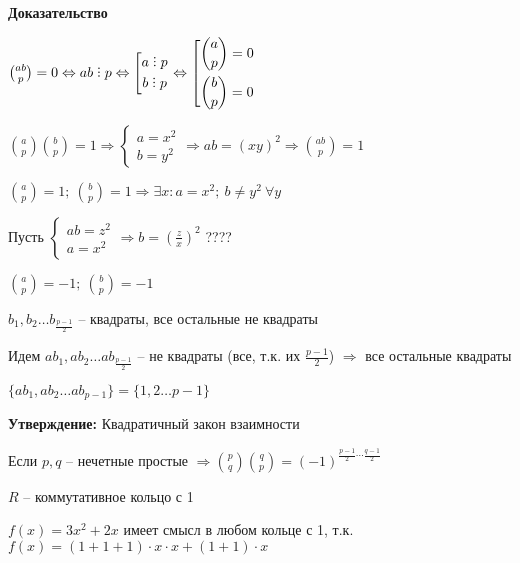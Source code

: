 \documentclass[14pt, letter paper]{article}
\DeclareRobustCommand{\divby}{%
  \mathrel{\text{\vbox{\baselineskip.65ex\lineskiplimit0pt\hbox{.}\hbox{.}\hbox{.}}}}%
}
\begin{document}
\begin{enumerate}
    \begin{center}
        \textbf{Доказательство}
    \end{center}

    ${ab \choose p} = 0 \Leftrightarrow ab \divby p \Leftrightarrow \left[ \begin{gathered}
        a \divby p \\
        b \divby p
    \end{gathered} \right. \Leftrightarrow \left[ \begin{gathered}
        {a \choose p} = 0 \\
        {b \choose p} = 0
    \end{gathered} \right.$

    ${a \choose p}{b \choose p} = 1 \Rightarrow \begin{cases}
        a = x^2 \\
        b = y^2
    \end{cases} \Rightarrow ab = (xy)^2 \Rightarrow {ab \choose p} = 1$

    ${a \choose p} = 1;\ {b \choose p} = 1 \Rightarrow \exists x : a = x^2;\ b \neq y^2\ \forall y$

    Пусть $\begin{cases}
        ab = z^2 \\
        a = x^2
    \end{cases} \Rightarrow b = (\frac{z}{x})^2$ ????

    ${a \choose p} = -1;\ {b \choose p} = -1$

    $b_1, b_2 \ldots b_\frac{p-1}{2}$ -- квадраты, все остальные не квадраты

    Идем $ab_1, ab_2 \ldots ab_\frac{p-1}{2}$ -- не квадраты (все, т.к. их $\frac{p-1}{2}$) $\Rightarrow$ все остальные квадраты

    $\{ab_1, ab_2 \ldots ab_{p-1}\} = \{1, 2 \ldots p-1\}$

    \textbf{Утверждение:} Квадратичный закон взаимности

    Если $p, q$ -- нечетные простые $\Rightarrow {p \choose q}{q \choose p} = (-1)^{\frac{p-1}{2} \cdots \frac{q-1}{2}}$
\end{enumerate}

\vspace{5mm}

$R$ -- коммутативное кольцо с 1

$f(x) = 3x^2 + 2x$ имеет смысл в любом кольце с 1, т.к. $f(x) = (1 + 1 + 1) \cdot x \cdot x + (1 + 1) \cdot x$
\end{document}
